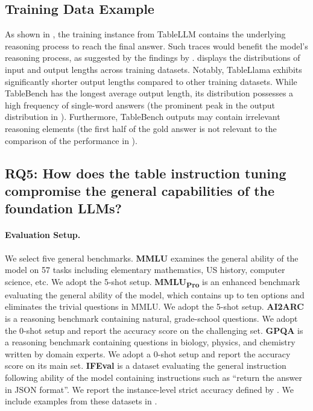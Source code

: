 \documentclass[11pt]{article}
\begin{document}
\subsection{Training Data Example}
\label{appx-subsec: train-data-examples}

As shown in , the training instance from TableLLM contains the underlying reasoning process to reach the final answer.
Such traces would benefit the model's reasoning process, as suggested by the findings by \citet{guo2025deepseek, muennighoff2025s1}.
 displays the distributions of input and output lengths across training datasets. 
Notably, TableLlama exhibits significantly shorter output lengths compared to other training datasets. 
While TableBench has the longest average output length, its distribution possesses a high frequency of single-word answers (the prominent peak in the output distribution in ). 
Furthermore, TableBench outputs may contain irrelevant reasoning elements (the first half of the gold answer is not relevant to the comparison of the performance in ).

\subsection{RQ5: How does the table instruction tuning compromise the general capabilities of the foundation LLMs?}
\label{app-subsec: affect-general-capabilities}

\paragraph{Evaluation Setup.}
We select five general benchmarks.
\textbf{MMLU} \citep{hendryckstest2021} examines the general ability of the model on 57 tasks including elementary mathematics, US history, computer science, etc.
We adopt the 5-shot setup.
\textbf{MMLU\textsubscript{Pro}} \citep{wang2024mmlupro} is an enhanced benchmark evaluating the general ability of the model, which contains up to ten options and eliminates the trivial questions in MMLU.
We adopt the 5-shot setup.
\textbf{AI2ARC} \citep{clark2018think} is a reasoning benchmark containing natural, grade-school questions. 
We adopt the 0-shot setup and report the accuracy score on the challenging set.
\textbf{GPQA} \citep{rein2023gpqa} is a reasoning benchmark containing questions in biology, physics, and chemistry written by domain experts. 
We adopt a 0-shot setup and report the accuracy score on its main set.
\textbf{IFEval} \citep{zhou2023instruction} is a dataset evaluating the general instruction following ability of the model containing instructions such as ``return the answer in JSON format''.
We report the instance-level strict accuracy defined by \citet{zhou2023instruction}.
We include examples from these datasets in .
\end{document}
